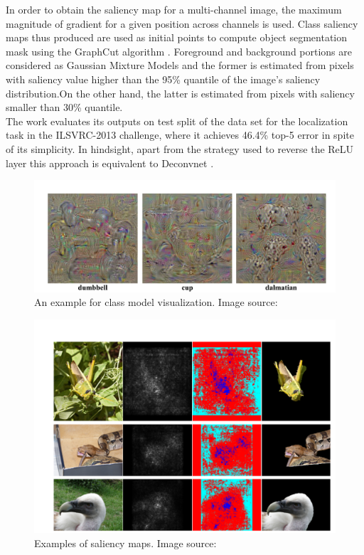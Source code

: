 \documentclass[../report.tex]{subfiles}
\begin{document}
 In order to obtain the saliency map for a multi-channel image, the maximum magnitude of gradient for a given position across channels is used. Class saliency maps thus produced are used as initial points  to compute object segmentation mask using the GraphCut algorithm \cite{boykov2006graph}. Foreground and background portions are considered as Gaussian Mixture Models and the former is estimated from pixels with saliency value higher than the 95\% quantile of the image’s saliency distribution.On the other hand, the latter is estimated from pixels with saliency smaller than 30\% quantile.\\
 The work evaluates its outputs on test split of the data set for the localization task in the ILSVRC-2013 \cite{ILSVRC15} challenge, where it achieves 46.4\% top-5 error in spite of its simplicity.
 In hindsight, apart from the strategy used to reverse the ReLU layer this approach is equivalent to Deconvnet \cite{matthew2014visualizing}.
 
 
 \begin{figure}[H]
 	\centering
 	\includegraphics[scale=0.25]{images/chapter3/saliency_1.png}
 	\caption{An example for class model visualization. Image source: \cite{simonyan2013deep}}
 	\label{fig_cmv}
 \end{figure}
 
  \begin{figure}[H]
  	\centering
 	\includegraphics[scale=0.2]{images/chapter3/saliency_2.png}
 	\caption{Examples of saliency maps. Image source: \cite{simonyan2013deep}}
 	\label{fig_saliency_map}
 \end{figure}
 
\end{document}
